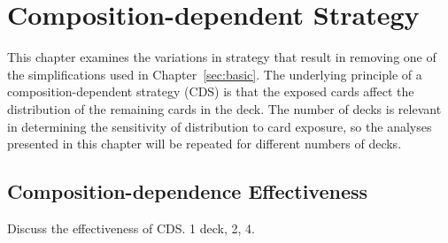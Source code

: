 
\chapter{Composition-dependent Strategy}
\label{sec:composition}

This chapter examines the variations in strategy that result in
removing one of the simplifications used in Chapter~\ref{sec:basic}.
The underlying principle of a composition-dependent strategy (CDS)
is that the exposed cards affect the distribution of the remaining
cards in the deck.
The number of decks is relevant in determining
the sensitivity of distribution to card exposure, 
so the analyses presented in this chapter 
will be repeated for different numbers of decks.


\section{Composition-dependence Effectiveness}
\label{sec:composition:eff}

Discuss the effectiveness of CDS.
1 deck, 2, 4.

